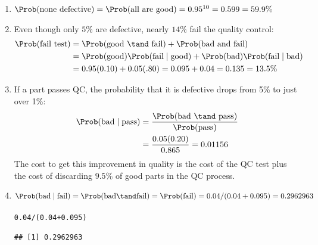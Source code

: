 \documentclass[twoside]{book}\usepackage[]{graphicx}\usepackage[]{xcolor}
\makeatletter
\newcommand{\hlnum}[1]{\textcolor[rgb]{0.686,0.059,0.569}{#1}}%
\newcommand{\hlopt}[1]{\textcolor[rgb]{0,0,0}{#1}}%
\newcommand{\hlstd}[1]{\textcolor[rgb]{0.345,0.345,0.345}{#1}}%
\newenvironment{kframe}{%
 \def\at@end@of@kframe{}%
 \ifinner\ifhmode%
  \def\at@end@of@kframe{\end{minipage}}%
  \begin{minipage}{\columnwidth}%
 \fi\fi%
 \def\FrameCommand##1{\hskip\@totalleftmargin \hskip-\fboxsep
 \colorbox{shadecolor}{##1}\hskip-\fboxsep
     \hskip-\linewidth \hskip-\@totalleftmargin \hskip\columnwidth}%
 \MakeFramed {\advance\hsize-\width
   \@totalleftmargin\z@ \linewidth\hsize
   \@setminipage}}%
 {\par\unskip\endMakeFramed%
 \at@end@of@kframe}
\newenvironment{knitrout}{}{} %
\makeatother
\begin{document}
\begin{solution}
\begin{enumerate}
\item
$\Prob(\mbox{none defective}) = \Prob(\mbox{all are good}) = 
0.95^{10} = 0.599 = 59.9\%$
\item
Even though only $5$\% are defective, nearly $14$\% fail the quality control:
\begin{align*}
\Prob(\mbox{fail test}) 
&= \Prob(\mbox{good \tand fail}) + \Prob(\mbox{bad and fail}) 
\\
& = \Prob(\mbox{good}) \Prob(\mbox{fail}\mid \mbox{good}) 
	+ \Prob(\mbox{bad}) \Prob(\mbox{fail}\mid \mbox{bad}) 
	\\
&= 0.95 (0.10) + 0.05 (.80) = 0.095 + 0.04 = 0.135 = 13.5\%
\end{align*}
\item
If a part passes QC, the probability that it is defective
drops from 5\% to just over 1\%:  
\begin{align*}
\Prob(\mbox{bad} \mid \mbox{pass}) 
&= \frac{ \Prob(\mbox{bad \tand pass})}{\Prob(\mbox{pass})}
\\
& = 
\frac{ 0.05 (0.20) }{ 0.865 }
=
0.01156
\end{align*}
The cost to get this improvement 
in quality is the cost of the QC test plus the cost of discarding $9.5$\% of 
good parts in the QC process.  
\item
	\[
	\Prob( \mbox{bad} \mid \mbox{fail} ) = 
	\Prob( \mbox{bad} \tand  \mbox{fail} ) = 
	\Prob( \mbox{fail} )  
	= 0.04 / (0.04 + 0.095)
	= 0.2962963
	\]
\begin{knitrout}
\color{fgcolor}\begin{kframe}
\begin{alltt}
\hlnum{0.04}\hlopt{/}\hlstd{(}\hlnum{0.04} \hlopt{+} \hlnum{0.095}\hlstd{)}
\end{alltt}
\begin{verbatim}
## [1] 0.2962963
\end{verbatim}
\end{kframe}
\end{knitrout}
\end{enumerate}
\end{solution}
\end{document}
